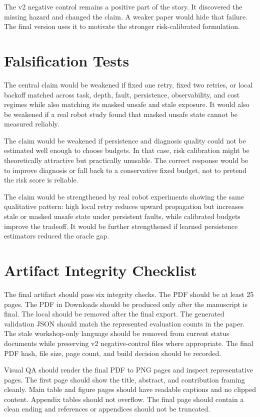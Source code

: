 The v2 negative control remains a positive part of the story. It discovered the missing hazard and changed the claim. A weaker paper would hide that failure. The final version uses it to motivate the stronger risk-calibrated formulation.

\section{Falsification Tests}

The central claim would be weakened if fixed one retry, fixed two retries, or local backoff matched \method across task, depth, fault, persistence, observability, and cost regimes while also matching its masked unsafe and stale exposure. It would also be weakened if a real robot study found that masked unsafe state cannot be measured reliably.

The claim would be weakened if persistence and diagnosis quality could not be estimated well enough to choose budgets. In that case, risk calibration might be theoretically attractive but practically unusable. The correct response would be to improve diagnosis or fall back to a conservative fixed budget, not to pretend the risk score is reliable.

The claim would be strengthened by real robot experiments showing the same qualitative pattern: high local retry reduces upward propagation but increases stale or masked unsafe state under persistent faults, while calibrated budgets improve the tradeoff. It would be further strengthened if learned persistence estimators reduced the oracle gap.

\section{Artifact Integrity Checklist}

The final artifact should pass six integrity checks. The PDF should be at least 25 pages. The PDF in Downloads should be produced only after the manuscript is final. The local  should be removed after the final export. The generated validation JSON should match the represented evaluation counts in the paper. The stale workshop-only language should be removed from current status documents while preserving v2 negative-control files where appropriate. The final PDF hash, file size, page count, and build decision should be recorded.

Visual QA should render the final PDF to PNG pages and inspect representative pages. The first page should show the title, abstract, and contribution framing cleanly. Main table and figure pages should have readable captions and no clipped content. Appendix tables should not overflow. The final page should contain a clean ending and references or appendices should not be truncated.

